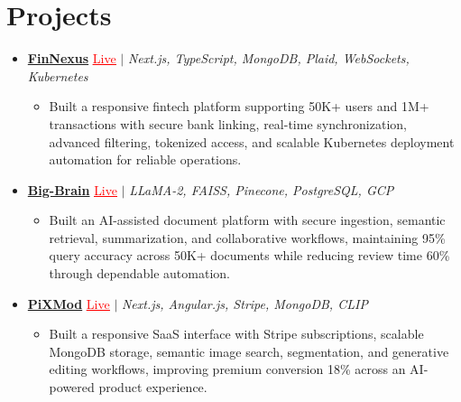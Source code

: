 \documentclass[letterpaper,10pt]{article}
\newcommand{\itemTail}{\vspace{-5pt}}
\newcommand{\projGap}{\vspace{3pt}}
\newcommand{\resumeItem}[1]{\item\small{{#1 \itemTail}}}
\newcommand{\resumeProjectHeading}[1]{\item \small #1 \vspace{-2pt}}
\newcommand{\resumeProjectLink}[2]{\href{#1}{\textcolor{red}{\underline{#2}}}}
\newcommand{\resumeSubHeadingListStart}{\begin{itemize}[leftmargin=0.0in, label={}]}
\newcommand{\resumeSubHeadingListEnd}{\end{itemize}}
\newcommand{\resumeProjItemListStart}{\begin{itemize}[leftmargin=0.15in,label=\textbullet,itemsep=3pt,topsep=0pt,parsep=0pt,partopsep=0pt]}
\newcommand{\resumeProjItemListEnd}{\end{itemize}\vspace{-4pt}}
\begin{document}
\section{Projects}
\resumeSubHeadingListStart
\vspace{-2pt}
\resumeProjectHeading{\href{https://fin-nexus.vercel.app/}{\textbf{FinNexus}} \resumeProjectLink{https://fin-nexus.vercel.app/}{Live} $|$ \emph{Next.js, TypeScript, MongoDB, Plaid, WebSockets, Kubernetes}}
\resumeProjItemListStart
\resumeItem{Built a responsive fintech platform supporting 50K+ users and 1M+ transactions with secure bank linking, real-time synchronization, advanced filtering, tokenized access, and scalable Kubernetes deployment automation for reliable operations.}
\resumeProjItemListEnd
\projGap
\resumeProjectHeading{\href{https://big-brain-pied.vercel.app/}{\textbf{Big-Brain}} \resumeProjectLink{https://big-brain-pied.vercel.app/}{Live} $|$ \emph{LLaMA-2, FAISS, Pinecone, PostgreSQL, GCP}}
\resumeProjItemListStart
\resumeItem{Built an AI-assisted document platform with secure ingestion, semantic retrieval, summarization, and collaborative workflows, maintaining 95\% query accuracy across 50K+ documents while reducing review time 60\% through dependable automation.}
\resumeProjItemListEnd
\projGap
\resumeProjectHeading{\href{https://pixmod.vercel.app/}{\textbf{PiXMod}} \resumeProjectLink{https://pixmod.vercel.app/}{Live} $|$ \emph{Next.js, Angular.js, Stripe, MongoDB, CLIP}}
\resumeProjItemListStart
\resumeItem{Built a responsive SaaS interface with Stripe subscriptions, scalable MongoDB storage, semantic image search, segmentation, and generative editing workflows, improving premium conversion 18\% across an AI-powered product experience.}
\resumeProjItemListEnd
\resumeSubHeadingListEnd
\end{document}
